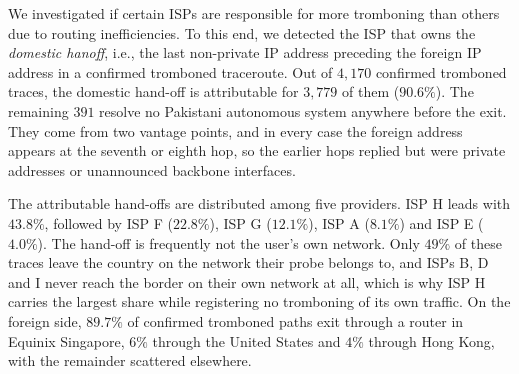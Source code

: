 \documentclass[sigconf,anonymous,10pt]{acmart}
\begin{document}


We investigated if certain ISPs are responsible for more tromboning than others due to routing inefficiencies. To this end, we detected the ISP that owns the \textit{domestic hanoff}, i.e., the last non-private IP address preceding the foreign IP address in a confirmed tromboned traceroute. %
Out of $4{,}170$ confirmed tromboned traces, the domestic hand-off is attributable for $3{,}779$ of them ($90.6\%$). The remaining $391$ resolve no Pakistani autonomous system anywhere before the exit. They come from two vantage points, and in every case the foreign address appears at the seventh or eighth hop, so the earlier hops replied but were private addresses or unannounced backbone interfaces.

The attributable hand-offs are distributed among five providers. ISP H leads with $43.8\%$, followed by ISP F ($22.8\%$), ISP G ($12.1\%$), ISP A ($8.1\%$) and ISP E ($4.0\%$). The hand-off is frequently not the user's own network. Only $49\%$ of these traces leave the country on the network their probe belongs to, and ISPs B, D and I never reach the border on their own network at all, which is why ISP H carries the largest share while registering no tromboning of its own traffic. On the foreign side, $89.7\%$ of confirmed tromboned paths exit through a router in Equinix Singapore, $6\%$ through the United States and $4\%$ through Hong Kong, with the remainder scattered elsewhere.
\end{document}
